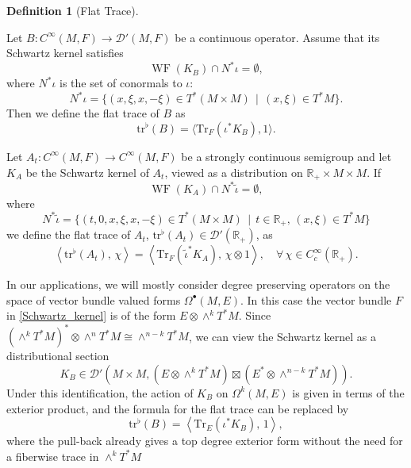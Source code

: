 \documentclass[reqno]{amsart}
\theoremstyle{definition}
\newtheorem{defn}[thm]{Definition}
\theoremstyle{remark}
\newcommand{\R}{\mathbb{R}}
\newcommand{\D}{\mathcal{D}'}
\newcommand{\C}{C^\infty}
\newcommand{\tr}{\mathrm{tr}^\flat}
\newcommand{\pair}[2]{\left\langle #1,\, #2 \right\rangle}
\DeclareMathOperator{\WF}{WF}
\begin{document}
\begin{defn}[Flat Trace]
\label{def_trace}

Let $B \colon \C(M,F) \to \D(M,F)$ be a continuous operator. Assume that its Schwartz kernel satisfies
\begin{equation}
\label{WFcondition}
\WF(K_B) \cap N^*\iota = \emptyset,
\end{equation}
where $N^*\iota$ is the set of conormals to $\iota$:
\begin{equation}
\label{conormal_diagonal}
    N^*\iota = \{(x,\xi,x,-\xi) \in T^*(M\times M) \,\mid\, (x,\xi) \in T^*M\}.
\end{equation}
Then we define the flat trace of $B$ as
\begin{equation}
\label{def_trace_formula}
    \tr(B) = \langle \mathrm{Tr}_F(\iota^*K_B), 1 \rangle.
\end{equation}

Let $A_t: \C(M,F)\to \C(M,F)$ be a strongly continuous semigroup and let $K_A$ be the Schwartz kernel of $A_t$, viewed as a distribution on $\R_+\times M\times M$. If
\begin{equation}
\label{WFcondition2}
    \WF(K_A) \cap N^*\tilde{\iota} = \emptyset,
\end{equation}
where
$$N^*\tilde{\iota} = \{(t,0,x,\xi,x,-\xi) \in T^*(M\times M) \,\mid\, t\in\R_+,\, (x,\xi) \in T^*M\}$$
we define the flat trace of $A_t$, $\tr(A_t) \in \D(\R_+)$, as
\begin{equation}
\label{def_trace_formula2}
    \pair{\tr(A_t)}{\chi} = \pair{\mathrm{Tr}_F(\tilde{\iota}^*K_A)}{\chi\otimes 1}, \quad \forall\,\chi\in\C_c(\R_+).
\end{equation}
\end{defn}

\begin{rmk}
\label{remark_schwartz_kernel}
In our applications, we will mostly consider degree preserving operators on the space of vector bundle valued forms $\Omega^\bullet(M,E)$. In this case the vector bundle $F$ in \eqref{Schwartz_kernel} is of the form $E\otimes\wedge^kT^*M$. Since $(\wedge^kT^*M)^*\otimes\wedge^nT^*M \cong \wedge^{n-k}T^*M$, we can view the Schwartz kernel as a distributional section
$$ K_B \in \D(M\times M, (E\otimes\wedge^k T^*M)\boxtimes (E^*\otimes \wedge^{n-k} T^*M)).$$
Under this identification, the action of $K_B$ on $\Omega^k(M,E)$ is given in terms of the exterior product, and the formula for the flat trace can be replaced by
$$\tr(B) = \pair{\mathrm{Tr}_E(\iota^*K_B)}{1},$$
where the pull-back already gives a top degree exterior form without the need for a fiberwise trace in $\wedge^kT^*M$
\end{rmk}
\end{document}
